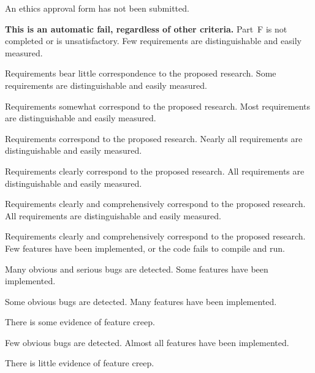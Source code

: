 \rubricyearthree
{}
\begin{markingrubric}
		\grade\fail An ethics approval form has not been submitted.
			\par \textbf{This is an automatic fail, regardless of other criteria.}
		\grade\fail Part~F is not completed or is unsatisfactory.
        \grade \fail Few requirements are distinguishable and easily measured.
            \par Requirements bear little correspondence to the proposed research.
        \grade Some requirements are distinguishable and easily measured.
            \par Requirements somewhat correspond to the proposed research.
        \grade Most requirements are distinguishable and easily measured.
            \par Requirements correspond to the proposed research.
        \grade Nearly all requirements are distinguishable and easily measured.
            \par Requirements clearly correspond to the proposed research.
        \grade All requirements are distinguishable and easily measured.
            \par Requirements clearly and comprehensively correspond to the proposed research.
        \grade All requirements are distinguishable and easily measured.
            \par Requirements clearly and comprehensively correspond to the proposed research.
%
        \grade \fail Few features have been implemented, or the code fails to compile and run.
            \par Many obvious and serious bugs are detected.
        \grade Some features have been implemented.
            \par Some obvious bugs are detected.
        \grade Many features have been implemented.
            \par There is some evidence of feature creep.
            \par Few obvious bugs  are detected.
        \grade Almost all features have been implemented.
            \par There is little evidence of feature creep.

\end{markingrubric}
